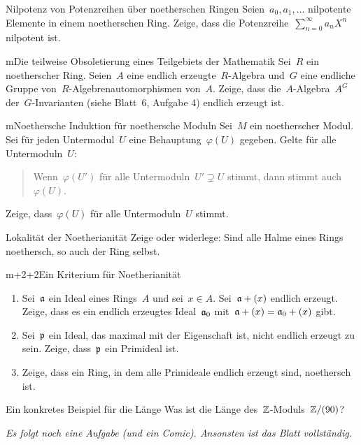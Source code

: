 \documentclass[entwurf]{uebblatt}
\begin{document}

\begin{aufgabe}{2}{Nilpotenz von Potenzreihen über noetherschen Ringen}
Seien~$a_0, a_1, \ldots$ nilpotente Elemente in einem noetherschen Ring. Zeige,
dass die Potenzreihe~$\sum_{n=0}^\infty a_n X^n$ nilpotent ist.
\end{aufgabe}

\begin{aufgabe}{m}{Die teilweise Obsoletierung eines Teilgebiets der Mathematik}
Sei~$R$ ein noetherscher Ring. Seien~$A$ eine
endlich erzeugte~$R$-Algebra und~$G$ eine endliche Gruppe von~$R$-Algebrenautomorphismen
von~$A$. Zeige, dass die~$A$-Algebra~$A^G$ der~$G$-Invarianten (siehe Blatt~6,
Aufgabe 4) endlich erzeugt ist.
\end{aufgabe}

\begin{aufgabe}{m}{Noethersche Induktion für noethersche Moduln}
Sei~$M$ ein noetherscher Modul. Sei für jeden Untermodul~$U$ eine
Behauptung~$\varphi(U)$ gegeben. Gelte für alle Untermoduln~$U$:
\begin{quote}Wenn~$\varphi(U')$ für alle Untermoduln~$U'
\supsetneq U$ stimmt, dann stimmt auch~$\varphi(U)$.\end{quote}
Zeige, dass~$\varphi(U)$ für alle Untermoduln~$U$ stimmt.
\end{aufgabe}

\begin{aufgabe}{2}{Lokalität der Noetherianität}
Zeige oder widerlege: Sind alle Halme eines Rings noethersch, so auch der Ring
selbst.
\end{aufgabe}

\begin{aufgabe}{m+2+2}{Ein Kriterium für Noetherianität}
\begin{enumerate}
\item Sei~$\mathfrak{a}$ ein Ideal eines Rings~$A$ und sei~$x \in A$. Sei~$\mathfrak{a} + (x)$
endlich erzeugt. Zeige, dass es ein endlich erzeugtes Ideal~$\mathfrak{a}_0$ mit~$\mathfrak{a}
+ (x) = \mathfrak{a}_0 + (x)$ gibt.
\item Sei~$\mathfrak{p}$ ein Ideal, das maximal mit der Eigenschaft ist,
nicht endlich erzeugt zu sein. Zeige, dass~$\mathfrak{p}$ ein Primideal ist.
\item Zeige, dass ein Ring, in dem alle Primideale endlich erzeugt sind,
noethersch ist.
\end{enumerate}
\end{aufgabe}

\begin{aufgabe}{2}{Ein konkretes Beispiel für die Länge}
Was ist die Länge des~$\mathbb{Z}$-Moduls~$\mathbb{Z}/(90)$?
\end{aufgabe}

\centering
\emph{Es folgt noch eine Aufgabe (und ein Comic). Ansonsten ist das Blatt
vollständig.}
\par
\end{document}

